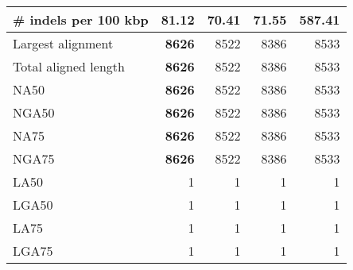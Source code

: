 \documentclass[12pt,a4paper]{article}
\begin{document}
\begin{table}[ht]
\begin{center}
\begin{tabular}{|l*{4}{|r}|}
\# indels per 100 kbp & 81.12 & {\bf 70.41} & 71.55 & 587.41 \\ \hline
Largest alignment & {\bf 8626} & 8522 & 8386 & 8533 \\ \hline
Total aligned length & {\bf 8626} & 8522 & 8386 & 8533 \\ \hline
NA50 & {\bf 8626} & 8522 & 8386 & 8533 \\ \hline
NGA50 & {\bf 8626} & 8522 & 8386 & 8533 \\ \hline
NA75 & {\bf 8626} & 8522 & 8386 & 8533 \\ \hline
NGA75 & {\bf 8626} & 8522 & 8386 & 8533 \\ \hline
LA50 & 1 & 1 & 1 & 1 \\ \hline
LGA50 & 1 & 1 & 1 & 1 \\ \hline
LA75 & 1 & 1 & 1 & 1 \\ \hline
LGA75 & 1 & 1 & 1 & 1 \\ \hline
\end{tabular}
\end{center}
\end{table}
\end{document}
